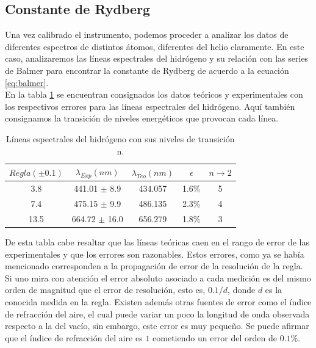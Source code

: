 \documentclass[%
 reprint,
 amsmath,amssymb,
 aps,
]{revtex4-1}
\begin{document}
\subsection{\label{sec:level2}Constante de Rydberg}
Una vez calibrado el instrumento, podemos proceder a analizar los datos de diferentes espectros de distintos átomos, diferentes del helio claramente. En este caso, analizaremos las líneas espectrales del hidrógeno y su relación con las series de Balmer para encontrar la constante de Rydberg de acuerdo a la ecuación \ref{eq:balmer}.\\

En la tabla \ref{table:hidrogeno} se encuentran consignados los datos teóricos y experimentales con los respectivos errores para las líneas espectrales del hidrógeno. Aquí también consignamos la transición de niveles energéticos que provocan cada línea.\\

\begin{table}[h!]
\centering
 \begin{tabular}{|c|c|c|c|c|} 
 \hline
 $Regla (\pm0.1) $ & $\lambda_{Exp} (nm)$ & $\lambda_{Teo} (nm)$ & $\epsilon$ & $ n \rightarrow 2 $\\ [0.5ex] 
 \hline\hline
3.8 &	441.01 $\pm$ 8.9 & 434.057 & 1.6\% & 5\\
7.4 &	475.15 $\pm$ 9.9 & 486.135 & 2.3\% & 4\\
13.5 &	664.72 $\pm$ 16.0& 656.279 & 1.8\% & 3\\
[1ex] 
 \hline
 \end{tabular}
 \caption{Líneas espectrales del hidrógeno con sus niveles de transición n.}
 \label{table:hidrogeno}
\end{table}

De esta tabla cabe resaltar que las líneas teóricas caen en el rango de error de las experimentales y que los errores son razonables. Estos errores, como ya se había mencionado corresponden a la propagación de error de la resolución de la regla. Si uno mira con atención el error absoluto asociado a cada medición es del mismo orden de magnitud que el error de resolución, esto es, $0.1/d$, donde $d$ es la conocida medida en la regla. Existen además otras fuentes de error como el índice de refracción del aire, el cual puede variar un poco la longitud de onda observada respecto a la del vacío, sin embargo, este error es muy pequeño. Se puede afirmar que el índice de refracción del aire es $1$ cometiendo un error del orden de $0.1\%$.\\
\end{document}
